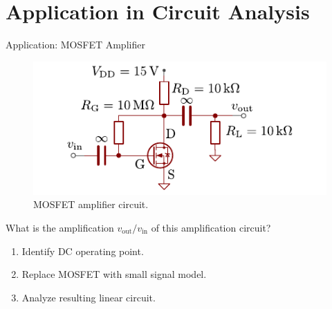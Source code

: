\section{Application in Circuit Analysis}

\begin{frame}{Application: MOSFET Amplifier}
    \begin{figure}
        \centering
        \includegraphics{../assets/example_circuit_small.pdf}
        \caption{MOSFET amplifier circuit.}
        \label{fig:mosfet_amplifier}
    \end{figure}

    What is the amplification $v_\mathrm{out}/v_\mathrm{in}$ of this amplification circuit?
    \begin{enumerate}
        \item Identify DC operating point.
        \item Replace MOSFET with small signal model.
        \item Analyze resulting linear circuit.
    \end{enumerate}
\end{frame}

